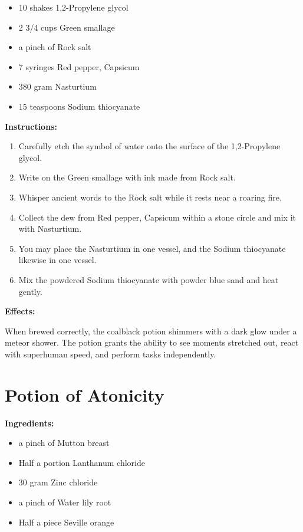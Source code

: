 \documentclass{article}
\begin{document}
\begin{itemize}
  \item 10 shakes 1,2-Propylene glycol
  \item 2 3/4 cups Green smallage
  \item a pinch of Rock salt
  \item 7 syringes Red pepper, Capsicum
  \item 380 gram Nasturtium
  \item 15 teaspoons Sodium thiocyanate
\end{itemize}

\textbf{Instructions:}

\begin{enumerate}
  \item Carefully etch the symbol of water onto the surface of the 1,2-Propylene glycol.
  \item Write on the Green smallage with ink made from Rock salt.
  \item Whisper ancient words to the Rock salt while it rests near a roaring fire.
  \item Collect the dew from Red pepper, Capsicum within a stone circle and mix it with Nasturtium.
  \item You may place the Nasturtium in one vessel, and the Sodium thiocyanate likewise in one vessel.
  \item Mix the powdered Sodium thiocyanate with powder blue sand and heat gently.
\end{enumerate}

\textbf{Effects:}

When brewed correctly, the coalblack potion shimmers with a dark glow under a meteor shower. The potion grants the ability to see moments stretched out, react with superhuman speed, and perform tasks independently.

\newpage
\section*{Potion of Atonicity}

\textbf{Ingredients:}

\begin{itemize}
  \item a pinch of Mutton breast
  \item Half a portion Lanthanum chloride
  \item 30 gram Zinc chloride
  \item a pinch of Water lily root
  \item Half a piece Seville orange
\end{itemize}
\end{document}
